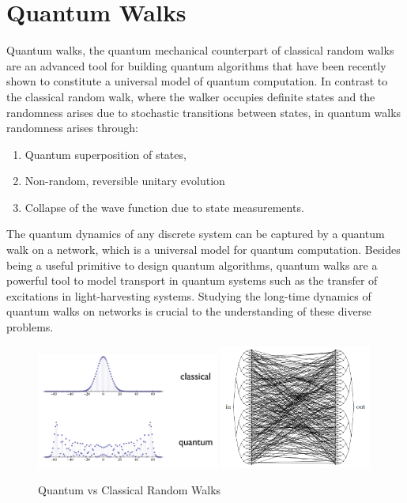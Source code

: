 \documentclass[
10pt, %
a4paper, %
oneside, %
headinclude,footinclude, %
BCOR5mm, %
]{scrartcl}
\begin{document}
\section{Quantum Walks}

Quantum walks, the quantum mechanical counterpart of classical random walks are an advanced tool for building quantum algorithms that have been recently shown to constitute a universal model of quantum computation. In contrast to the classical random walk, where the walker occupies definite states and the randomness arises due to stochastic transitions between states, in quantum walks randomness arises through:
\begin{enumerate}
    \item Quantum superposition of states,
    \item Non-random, reversible unitary evolution
    \item Collapse of the wave function due to state measurements.
\end{enumerate}

The quantum dynamics of any discrete system can be captured by a quantum walk on a network, which is a universal model for quantum computation. Besides being a useful primitive to design quantum algorithms, quantum walks are a powerful tool to model transport in quantum systems such as the transfer of excitations in light-harvesting systems. Studying the long-time dynamics of quantum walks on networks is crucial to the understanding of these diverse problems.

\begin{figure}[H]
    \centering
    \includegraphics[width=60mm]{images/walks.png}
    \includegraphics[width=50mm]{images/walks2.png}
    \caption{Quantum vs Classical Random Walks}
\end{figure}
\end{document}
